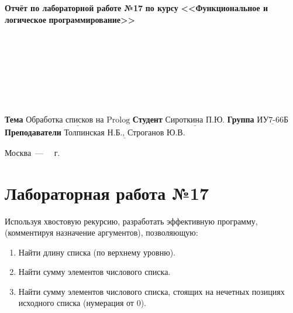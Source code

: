 \documentclass[12pt,a4paper]{scrreprt}
\begin{document}
\begin{titlepage}
		\begin{center}
			\noindent\begin{minipage}{1.3\textwidth}\centering
				\Large\textbf{  Отчёт по лабораторной работе №17}\newline
				\textbf{по курсу}\newline
				\textbf{<<Функциональное и логическое}\newline
				\textbf{\indent\indent\indent программирование>>}\newline
			\end{minipage}
		\end{center}
		
		~\\\\\\\\\\\\\\
		\normalsize
		\noindent\textbf{Тема } $\underline{\text{Обработка списков на Prolog}}$\newline\newline
		\noindent\textbf{Студент } $\underline{\text{Сироткина П.Ю.}}$\newline\newline
		\noindent\textbf{Группа } $\underline{\text{ИУ7-66Б}}$\newline\newline
		\noindent\textbf{Преподаватели } $\underline{\text{Толпинская Н.Б., Строганов Ю.В.}}$\newline
		
		\begin{center}
			\vfill
			Москва~---~\the\year
			~г.
		\end{center}
	\end{titlepage}
	
\chapter*{Лабораторная работа №17}

Используя хвостовую рекурсию, разработать эффективную программу, (комментируя назначение аргументов), позволяющую:

\begin{enumerate}
	\item Найти длину списка (по верхнему уровню).
	\item Найти сумму элементов числового списка.
	\item Найти сумму элементов числового списка, стоящих на нечетных позициях
	исходного списка (нумерация от 0).
\end{enumerate}
\end{document}

